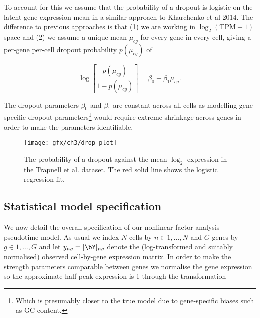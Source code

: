 To account for this we assume that the probability of a dropout is logistic on the latent gene expression mean in a similar approach to Kharchenko et al 2014. The difference to previous approaches is that (1) we are working in $\log_2(\text{TPM} + 1)$ space and (2) we assume a unique mean $\mu_{cg}$ for every gene in every cell, giving a per-gene per-cell dropout probability $p(\mu_{cg})$ of

\begin{equation}
\log\left[ \frac{p(\mu_{cg})}{1 - p(\mu_{cg})} \right] = \beta_0 + \beta_1 \mu_{cg}.
\end{equation}

The dropout parameters $\beta_0$ and $\beta_1$ are constant across all cells as modelling gene specific dropout parameters\footnote{Which is presumably closer to the true model due to gene-specific biases such as GC content.} would require extreme shrinkage across genes in order to make the parameters identifiable.


\begin{figure}
\centering
 \texttt{[image: gfx/ch3/drop\_plot]}
 \caption{The probability of a dropout against the mean $\log_2$ expression in the Trapnell et al. dataset. The red solid line shows the logistic regression fit.} \label{fig:dropout}
 \end{figure}

\subsection{Statistical model specification}


We now detail the overall specification of our nonlinear factor analysis pseudotime model. As usual we index $N$ cells by $n \in 1, \ldots, N$ and $G$ genes by $g \in 1, \ldots, G$ and let $y_{ng} = [\bY]_{ng}$ denote the (log-transformed and suitably normalised) observed cell-by-gene expression matrix. In order to make the strength parameters comparable between genes we normalise the gene expression so the approximate half-peak expression is 1 through the transformation


